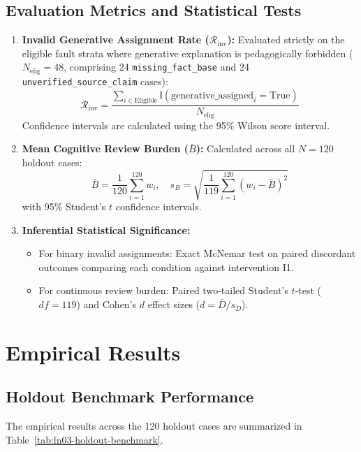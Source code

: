 \documentclass[11pt,a4paper]{article}
\begin{document}
\subsection{Evaluation Metrics and Statistical Tests}
\begin{enumerate}[leftmargin=*]
    \item \textbf{Invalid Generative Assignment Rate ($\mathcal{R}_{\text{inv}}$):} Evaluated strictly on the eligible fault strata where generative explanation is pedagogically forbidden ($N_{\text{elig}} = 48$, comprising 24 \texttt{missing\_fact\_base} and 24 \texttt{unverified\_source\_claim} cases):
    \begin{equation}
        \mathcal{R}_{\text{inv}} = \frac{\sum_{i \in \text{Eligible}} \mathbb{I}(\text{generative\_assigned}_i = \text{True})}{N_{\text{elig}}}
    \end{equation}
    Confidence intervals are calculated using the 95\% Wilson score interval.
    \item \textbf{Mean Cognitive Review Burden ($\bar{B}$):} Calculated across all $N=120$ holdout cases:
    \begin{equation}
        \bar{B} = \frac{1}{120} \sum_{i=1}^{120} w_i, \quad s_B = \sqrt{\frac{1}{119} \sum_{i=1}^{120} (w_i - \bar{B})^2}
    \end{equation}
    with 95\% Student's $t$ confidence intervals.
    \item \textbf{Inferential Statistical Significance:}
    \begin{itemize}
        \item For binary invalid assignments: Exact McNemar test on paired discordant outcomes comparing each condition against intervention I1.
        \item For continuous review burden: Paired two-tailed Student's $t$-test ($df = 119$) and Cohen's $d$ effect sizes ($d = \bar{D} / s_D$).
    \end{itemize}
\end{enumerate}

\section{Empirical Results}
\label{sec:results}

\subsection{Holdout Benchmark Performance}
The empirical results across the 120 holdout cases are summarized in Table~\ref{tab:ln03-holdout-benchmark}.
\end{document}
